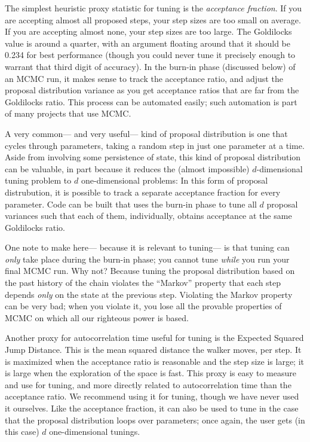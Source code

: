 \documentclass[12pt,twoside,pdftex]{article}
\begin{document}
The simplest heuristic proxy statistic for tuning is the \emph{acceptance fraction}.
If you are accepting almost all proposed steps, your step sizes are too small on average.
If you are accepting almost none, your step sizes are too large.
The Goldilocks value is around a quarter,
  with an argument floating around that it should be 0.234 for best performance
  (though you could never tune it precisely enough to warrant that third digit of accuracy).
In the burn-in phase (discussed below) of an MCMC run,
  it makes sense to track the acceptance ratio,
  and adjust the proposal distribution variance as you get acceptance ratios
  that are far from the Goldilocks ratio.
This process can be automated easily;
  such automation is part of many projects that use MCMC.


A very common---%
  and very useful---%
  kind of proposal distribution is one that cycles through parameters,
  taking a random step in just one parameter at a time.
Aside from involving some persistence of state,
  this kind of proposal distribution can be valuable,
  in part because it reduces the (almost impossible) $d$-dimensional tuning problem
  to $d$ one-dimensional problems:
In this form of proposal distrubution,
  it is possible to track a separate acceptance fraction for every parameter.
Code can be built that uses the burn-in phase to tune all $d$ proposal variances
  such that each of them, individually,
  obtains acceptance at the same Goldilocks ratio.

One note to make here---%
  because it is relevant to tuning---%
  is that tuning can \emph{only} take place during the burn-in phase;
  you cannot tune \emph{while} you run your final MCMC run.
Why not?
Because tuning the proposal distribution based on the past history of the chain
  violates the ``Markov'' property
  that each step depends \emph{only} on the state at the previous step.
Violating the Markov property can be very bad;
  when you violate it,
  you lose all the provable properties of MCMC
  on which all our righteous power is based.

Another proxy for autocorrelation time useful for tuning is the
  Expected Squared Jump Distance.
This is the mean squared distance the walker moves, per step.
It is maximized when the acceptance ratio is reasonable
  and the step size is large;
  it is large when the exploration of the space is fast.
This proxy is easy to measure and use for tuning,
  and more directly related to autocorrelation time than the acceptance ratio.
We recommend using it for tuning, though we have never used it ourselves.
Like the acceptance fraction, it can also be used to tune
  in the case that the proposal distribution loops over parameters;
  once again, the user gets (in this case) $d$ one-dimensional tunings.
\end{document}
